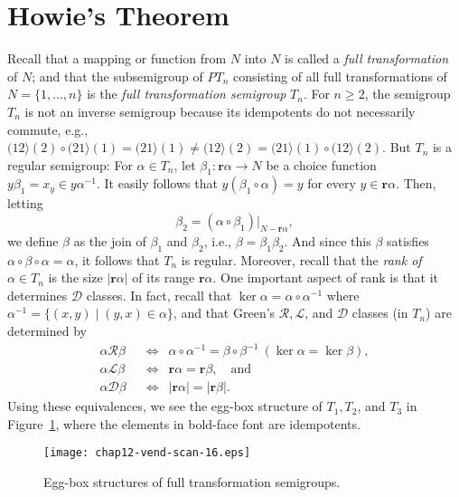 \documentclass{surv-l}
\numberwithin{equation}{section}
\numberwithin{table}{section}
\numberwithin{figure}{section}
\theoremstyle{plain}
\theoremstyle{definition}
\begin{document}
\section{Howie's Theorem}\label{sec12.60}

Recall that a mapping or function from $N$ into $N$ is called a
\emph{full transformation} of
$N$; and that the subsemigroup of $PT_{n}$ consisting of all full
transformations of $N=\{1,\ldots, n\}$ is the \emph{full
transformation semigroup} $T_{n}$. For $n\geq 2$, the semigroup
$T_{n}$ is not an inverse semigroup because its idempotents do not
necessarily commute, e.g.,
$(12\rangle(2)\circ (21\rangle(1)=(21\rangle(1)\neq(12\rangle(2)=(21\rangle(1)\circ
(12\rangle(2)$. But $T_{n}$ is a regular semigroup: For $\alpha\in
T_{n}$, let $\beta_{1} : \mathbf{r}\alpha\rightarrow N$ be a
choice function $y\beta_{1}=x_{y}\in y\alpha^{-1}$. It easily
follows that $y(\beta_{1}\circ\alpha)=y$ for every $y\in
\mathbf{r}\alpha$. Then, letting
\[
\beta_{2}=(\alpha \circ\beta_{1})|_{N-\mathbf{r}\alpha},
\]
we define $\beta$ as the join of $\beta_{1}$ and $\beta_{2}$,
i.e., $\beta=\beta_{1}\beta_{2}$. And since this $\beta$ satisfies
$\alpha\circ\beta \circ\alpha=\alpha$, it follows that $T_{n}$ is
regular. Moreover, recall that the \emph{rank of} $\alpha\in
T_{n}$ is the size $|\mathbf{r}\alpha|$ of its range
$\mathbf{r}\alpha$. One important aspect of rank is that it
determines $\mathcal{D}$ classes. In fact, recall that
$\ker \alpha=\alpha \circ\alpha^{-1}$ where
$\alpha^{-1}=\{(x, y)\mid (y,x)\in\alpha\}$, and that Green's
$\mathcal{R}, \mathcal{L}$, and $\mathcal{D}$ classes (in $T_{n}$)
are determined by
\begin{align*}
\alpha \mathcal{R}\beta\enspace &\Leftrightarrow\enspace \alpha\circ\alpha^{-1}=\beta\circ\beta^{-1}\ (\ker \alpha=\ker \beta), \\
\alpha \mathcal{L}\beta\enspace &\Leftrightarrow\enspace \mathbf{r}\alpha=\mathbf{r}\beta,\quad \mathrm{and} \\
\alpha \mathcal{D}\beta\enspace &\Leftrightarrow\enspace |\mathbf{r}\alpha|=|\mathbf{r}\beta|.
\end{align*}
Using these equivalences, we see the egg-box structure of $T_{1},
T_{2}$, and $T_{3}$ in Figure~\ref{fig12.60.1}, where the elements
in bold-face font are idempotents.

\begin{figure}[!h]
\texttt{[image: chap12-vend-scan-16.eps]}
\caption{Egg-box structures of full transformation semigroups.}\label{fig12.60.1}
\end{figure}
\end{document}
